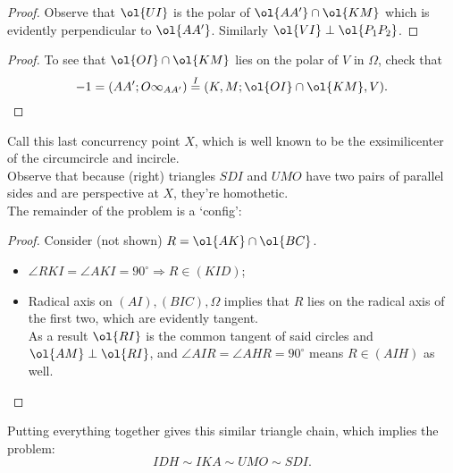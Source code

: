 \documentclass{seto}
\begin{document}
\begin{proof}Observe that $\ol{UI}$ is the polar of $\ol{AA'}\cap\ol{KM}$ which
is evidently perpendicular to $\ol{AA'}$. Similarly $\ol{VI}\perp\ol{P_1P_2}$.
\end{proof}
\begin{proof}
To see that $\ol{OI}\cap\ol{KM}$ lies on the polar of $V$ in $\Omega$, check that
\[-1=(AA';O\infty_{AA'})\overset I=(K,M;\ol{OI}\cap\ol{KM},V).\qedhere\]
\end{proof}
Call this last concurrency point $X$, 
which is well known to be the exsimilicenter of the circumcircle and incircle.\\[4pt]
Observe that because (right) triangles $SDI$ and $UMO$ have 
two pairs of parallel sides and are perspective at $X$,
they're homothetic.\\
The remainder of the problem is a `config':
\begin{proof}Consider (not shown) $R=\ol{AK}\cap\ol{BC}$.
\begin{itemize}
\item $\angle RKI=\angle AKI=90^\circ\Rightarrow R\in(KID)$;
\item Radical axis on $(AI),(BIC),\Omega$ implies that 
$R$ lies on the radical axis of the first two, which are evidently tangent.\\
As a result $\ol{RI}$ is the common tangent of said circles and $\ol{AM}\perp\ol{RI}$,
and $\angle AIR=\angle AHR=90^\circ$ means $R\in(AIH)$ as well.
\end{itemize}
\end{proof}
Putting everything together gives this similar triangle chain, which 
implies the problem:
\[IDH\sim IKA\sim UMO\sim SDI.\]
\newpage
\end{document}
